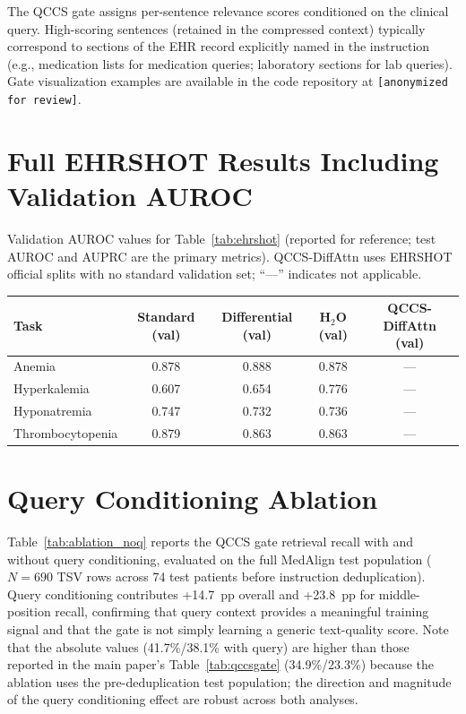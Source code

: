 \documentclass{article}
\begin{document}
The QCCS gate assigns per-sentence relevance scores conditioned on the clinical
query. High-scoring sentences (retained in the compressed context) typically
correspond to sections of the EHR record explicitly named in the instruction
(e.g., medication lists for medication queries; laboratory sections for lab
queries). Gate visualization examples are available in the code repository
at \texttt{[anonymized for review]}.

\section{Full EHRSHOT Results Including Validation AUROC}
\label{app:ehrshot}

Validation AUROC values for Table~\ref{tab:ehrshot} (reported for reference;
test AUROC and AUPRC are the primary metrics). QCCS-DiffAttn uses EHRSHOT
official splits with no standard validation set; ``---'' indicates not applicable.

\begin{center}
\small
\begin{tabular}{@{}lcccc@{}}
\toprule
Task & Standard (val) & Differential (val) & H$_2$O (val) & QCCS-DiffAttn (val) \\
\midrule
Anemia         & 0.878 & 0.888 & 0.878 & --- \\
Hyperkalemia   & 0.607 & 0.654 & 0.776 & --- \\
Hyponatremia   & 0.747 & 0.732 & 0.736 & --- \\
Thrombocytopenia & 0.879 & 0.863 & 0.863 & --- \\
\bottomrule
\end{tabular}
\end{center}

\section{Query Conditioning Ablation}
\label{app:noquery}

Table~\ref{tab:ablation_noq} reports the QCCS gate retrieval recall with and
without query conditioning, evaluated on the full MedAlign test population
($N{=}690$ TSV rows across 74 test patients before instruction deduplication).
Query conditioning contributes +14.7~pp overall and +23.8~pp for middle-position
recall, confirming that query context provides a meaningful training signal and
that the gate is not simply learning a generic text-quality score. Note that
the absolute values (41.7\%/38.1\% with query) are higher than those reported
in the main paper's Table~\ref{tab:qccsgate} (34.9\%/23.3\%) because the
ablation uses the pre-deduplication test population; the direction and magnitude
of the query conditioning effect are robust across both analyses.
\end{document}

